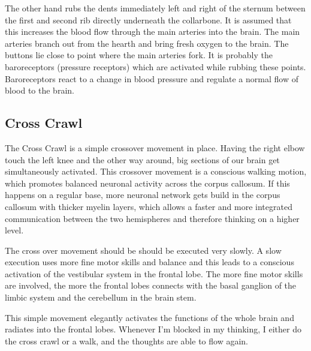 \documentclass[../main.tex]{subfiles}
\begin{document}
  The other hand rubs the dents immediately left and right of the sternum between the first and second rib directly underneath the collarbone.
  It is assumed that this {increases the blood} flow through the main arteries into the brain.
  The main arteries branch out from the hearth and bring {fresh oxygen to the brain}.
  The buttons lie close to point where the main arteries fork.
  It is probably the {baroreceptors} (pressure receptors) which are activated while rubbing these {points}.
  Baroreceptors react to a change in blood pressure and regulate a normal flow of blood to the brain.  


  \subsection{Cross Crawl}
  
  The Cross Crawl is a simple crossover movement in place. Having the right elbow touch the left knee and the other way around,
  big sections of our brain get simultaneously activated.
  This crossover movement is a conscious walking motion,
  which promotes balanced neuronal activity across the corpus callosum.
  If this happens on a regular base, more neuronal network gets build in the corpus callosum with thicker myelin layers,
  which allows a faster and more integrated communication between the two hemispheres
  and therefore thinking on a higher level.
  
  {The cross over movement should be should be {executed very slowly}.
    A slow execution uses more {fine motor skills} and {balance}  and this leads to a conscious activation of the {vestibular system} in the {frontal lobe}.
    The more fine motor skills are involved, the more the frontal lobes connects with the basal ganglion of the limbic system and the cerebellum in the brain stem.}

  This simple movement elegantly activates the functions of the whole brain and radiates  into the frontal lobes.
  Whenever I'm blocked in my thinking, I either do the cross crawl or a walk, and the thoughts are able to flow again.
\end{document}
